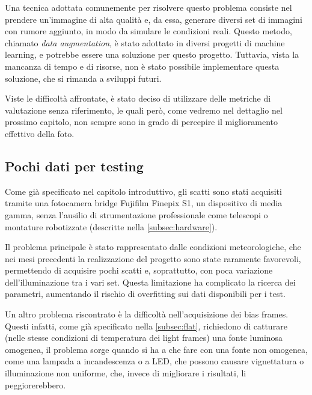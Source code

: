 Una tecnica adottata comunemente per risolvere questo problema consiste nel prendere un'immagine di alta qualità e, da essa, generare diversi set di immagini con rumore aggiunto, in modo da simulare le condizioni reali. Questo metodo, chiamato \textit{data augmentation}, è stato adottato in diversi progetti di machine learning, e potrebbe essere una soluzione per questo progetto. Tuttavia, vista la mancanza di tempo e di risorse, non è stato possibile implementare questa soluzione, che si rimanda a sviluppi futuri.

Viste le difficoltà affrontate, è stato deciso di utilizzare delle metriche di valutazione senza riferimento, le quali però, come vedremo nel dettaglio nel prossimo capitolo, non sempre sono in grado di percepire il miglioramento effettivo della foto.

\subsection{Pochi dati per testing}

Come già specificato nel capitolo introduttivo, gli scatti sono stati acquisiti tramite una fotocamera bridge Fujifilm Finepix S1, un dispositivo di media gamma, senza l'ausilio di strumentazione professionale come telescopi o montature robotizzate (descritte nella \cref{subsec:hardware}).

Il problema principale è stato rappresentato dalle condizioni meteorologiche, che nei mesi precedenti la realizzazione del progetto sono state raramente favorevoli, permettendo di acquisire pochi scatti e, soprattutto, con poca variazione dell'illuminazione tra i vari set. Questa limitazione ha complicato la ricerca dei parametri, aumentando il rischio di overfitting sui dati disponibili per i test.

Un altro problema riscontrato è la difficoltà nell'acquisizione dei bias frames. Questi infatti, come già specificato nella \cref{subsec:flat}, richiedono di catturare (nelle stesse condizioni di temperatura dei light frames) una fonte luminosa omogenea, il problema sorge quando si ha a che fare con una fonte non omogenea, come una lampada a incandescenza o a LED, che possono causare vignettatura o illuminazione non uniforme, che, invece di migliorare i risultati, li peggiorerebbero.

\cleardoublepage